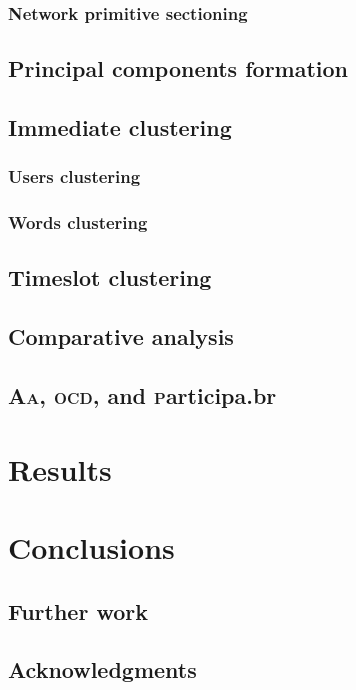 \documentclass[a4paper, 11pt]{article} %
\newcommand{\ocd}{\textsc{ocd}}
\newcommand{\participa}{\textsc{p}articipa.br}
\newcommand{\aai}{\textsc{Aa}}
\begin{document}
\subsubsection{Network primitive sectioning}

\subsection{Principal components formation}
\subsection{Immediate clustering}
\subsubsection{Users clustering}
\subsubsection{Words clustering}
\subsection{Timeslot clustering}
\subsection{Comparative analysis}
\subsection{\aai, \ocd, and \participa}

\section{Results}\label{sec:res}

\section{Conclusions}\label{sec:con}
\subsection{Further work}
\subsection{Acknowledgments}
\end{document}
